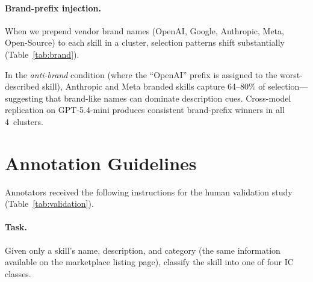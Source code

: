 \documentclass[11pt]{article}
\begin{document}
\paragraph{Brand-prefix injection.}
When we prepend vendor brand names (OpenAI, Google,
Anthropic, Meta, Open-Source) to each skill in a cluster,
selection patterns shift substantially (Table~\ref{tab:brand}).

\begin{table}[t]
\centering\small
{}
\caption{Brand-prefix ablation: adding vendor prefixes
shifts selection toward brand-associated skills.}
\label{tab:brand}
\end{table}

In the \emph{anti-brand} condition (where the ``OpenAI''
prefix is assigned to the worst-described skill), Anthropic
and Meta branded skills capture 64--80\% of
selection---suggesting that brand-like names can
dominate description cues.
Cross-model replication on GPT-5.4-mini produces
consistent brand-prefix winners in all 4~clusters.

\section{Annotation Guidelines}
\label{app:annotation_guide}

Annotators received the following instructions for the
human validation study (Table~\ref{tab:validation}).

\paragraph{Task.}
Given only a skill's name, description, and category
(the same information available on the marketplace
listing page), classify the skill into one of four IC
classes.
\end{document}
